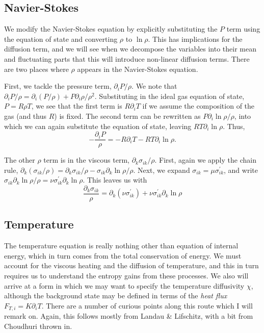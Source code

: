 \documentclass[letterpaper,12pt]{paper}
\newcommand{\lnrho}{\ensuremath{\ln \rho}}
\begin{document}
\subsection{Navier-Stokes}
\label{sec:ns}
We modify the Navier-Stokes equation by explicitly substituting the
$P$ term using the equation of state and converting $\rho$ to
$\lnrho$. This has implications for the diffusion term, and we will
see when we decompose the variables into their mean and fluctuating
parts that this will introduce non-linear diffusion terms. There are
two places where $\rho$ appears in the Navier-Stokes equation.

First, we tackle the pressure term, $\partial_i P/\rho$. We note that
$\partial_i P/\rho = \partial_i (P/\rho) + P \partial_i
\rho/\rho^2$.
Substituting in the ideal gas equation of state, $P = R \rho T$, we
see that the first term is $R \partial_i T$ if we assume the
composition of the gas (and thus $R$) is fixed. The second term can be
rewritten as $P \partial_i \lnrho/\rho$, into which we can again
substitute the equation of state, leaving $R T \partial_i
\lnrho$. Thus, 
\begin{equation}
  \label{eq:press_term}
  -\frac{\partial_i P}{\rho} = -R \partial_i T - R T \partial_i \lnrho.
\end{equation}

The other $\rho$ term is in the viscous term, $\partial_k
\sigma_{ik}/\rho$. First, again we apply the chain rule, $\partial_k
(\sigma_{ik}/\rho) = \partial_k \sigma_{ik}/\rho -
\sigma_{ik} \partial_k \lnrho/\rho$. Next, we expand $\sigma_{ik} = \mu
\sigma^{'}_{ik}$, and write $\sigma_{ik} \partial_k \lnrho/\rho = \nu
\sigma^{'}_{ik} \partial_k \lnrho$. This leaves us with 
\begin{equation}
  \label{eq:visc_term}
  \frac{\partial_k \sigma_{ik}}{\rho} = \partial_k (\nu
  \sigma^{'}_{ik}) + \nu \sigma^{'}_{ik} \partial_k \lnrho
\end{equation}
\subsection{Temperature}
\label{sec:temp}
The temperature equation is really nothing other than equation of
internal energy, which in turn comes from the total conservation of
energy. We must account for the viscous heating and the diffusion of
temperature, and this in turn requires us to understand the entropy
gains from these processes. We also will arrive at a form in which we
may want to specify the temperature diffusivity $\chi$, although the
background state may be defined in terms of the \emph{heat flux} $F_{T,i} =
K \partial_i T$. There are a number of curious points along this route
which I will remark on. Again, this follows mostly from Landau \&
Lifschitz, with a bit from Choudhuri thrown in.
\end{document}
